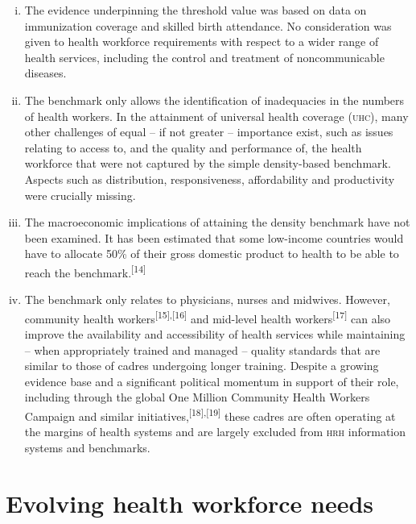 \documentclass{article}
\begin{document}
\begin{enumerate}[i.]
\item
The evidence underpinning the threshold value was based on data on immunization
coverage and
skilled birth attendance. No consideration was given to health workforce
requirements with respect
to a wider range of health services, including the control and treatment of
noncommunicable
diseases.

\item
The benchmark only allows the identification of inadequacies in the numbers of
health workers. In
the attainment of universal health coverage (\textsc{uhc}), many other challenges of
equal – if not
greater – importance exist, such as issues relating to access to, and the
quality and
performance of, the health workforce that were not captured by the simple
density-based benchmark.
Aspects such as distribution, responsiveness, affordability and productivity
were crucially
missing.

\item
The macroeconomic implications of attaining the density benchmark have not been
examined. It has
been estimated that some low-income countries would have to allocate 50\% of
their gross domestic
product to health to be able to reach the
benchmark.\textsuperscript{[}\textsuperscript{14}\textsuperscript{]}

\item
The benchmark only relates to physicians, nurses and midwives. However,
community health
workers\textsuperscript{[}\textsuperscript{15}\textsuperscript{]}\textsuperscript{,}\textsuperscript{[}\textsuperscript{16}\textsuperscript{]}
and mid-level health workers\textsuperscript{[}\textsuperscript{17}\textsuperscript{]}
can also improve the availability and accessibility of health services while
maintaining – when appropriately trained and managed – quality standards that
are
similar to those of cadres undergoing longer training. Despite a growing
evidence base and a
significant political momentum in support of their role, including through the
global One Million
Community Health Workers Campaign and similar
initiatives,\textsuperscript{[}\textsuperscript{18}\textsuperscript{]}\textsuperscript{,}\textsuperscript{[}\textsuperscript{19}\textsuperscript{]}
these cadres
are often operating at the margins of health systems and are largely excluded
from \textsc{hrh} information
systems and benchmarks.

\end{enumerate}

\section{Evolving health workforce needs}
\end{document}
